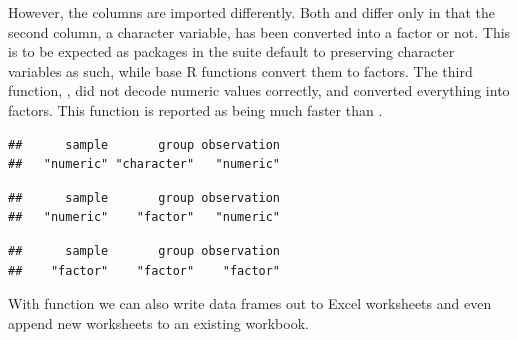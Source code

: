 \documentclass[krantz2,ChapterTOCs]{krantz}\usepackage{knitr}
\begin{document}
However, the columns are imported differently. Both  and  differ only in that the second column, a character variable, has been converted into a factor or not. This is to be expected as packages in the  suite default to preserving character variables as such, while base R functions convert them to factors. The third function, , did not decode numeric values correctly, and converted everything into factors. This function is reported as being much faster than .
\begin{knitrout}\footnotesize
{}\color{fgcolor}\begin{kframe}
\begin{alltt}
\end{alltt}
\begin{verbatim}
##      sample       group observation 
##   "numeric" "character"   "numeric"
\end{verbatim}
\begin{alltt}
\end{alltt}
\begin{verbatim}
##      sample       group observation 
##   "numeric"    "factor"   "numeric"
\end{verbatim}
\begin{alltt}
\end{alltt}
\begin{verbatim}
##      sample       group observation 
##    "factor"    "factor"    "factor"
\end{verbatim}
\end{kframe}
\end{knitrout}

With function  we can also write data frames out to Excel worksheets and even append new worksheets to an existing workbook.
\begin{knitrout}\footnotesize
{}\color{fgcolor}\begin{kframe}
\begin{alltt}
\hlstd{(}\hlstd{)}
 \hlkwb{<-} \hlstd{(} \hlstd{=} \hlopt{:}\hlstd{,}  \hlstd{=} \hlopt{:} \hlopt{+} \hlstd{(}\hlstd{))}
  \hlstd{=} \hlstd{,}  \hlstd{=} \hlstd{)}
  \hlstd{=} \hlstd{,}  \hlstd{=} \hlstd{,}  \hlstd{=} \hlstd{)}
\end{alltt}
\end{kframe}
\end{knitrout}
\end{document}
